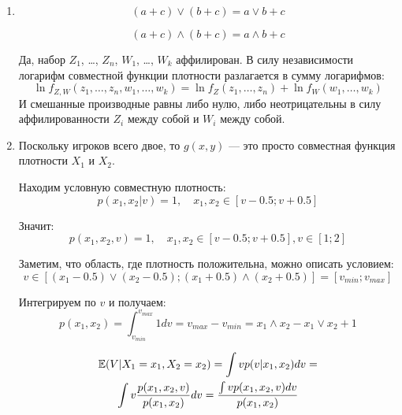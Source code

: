 \begin{enumerate}


\item
\begin{equation}
(a+c)\vee (b+c)=a\vee b +c
\end{equation}

\begin{equation}
(a+c)\wedge (b+c)=a\wedge b +c
\end{equation}

Да, набор $ Z_{1} $, \ldots , $ Z_{n} $, $ W_{1} $, \ldots , $ W_{k} $ аффилирован. В силу независимости логарифм совместной функции плотности разлагается в сумму логарифмов:
\begin{equation}
\ln f_{Z,W}(z_{1},\ldots ,z_{n},w_{1},\ldots ,w_{k})= \ln f_{Z}(z_{1},\ldots ,z_{n})+\ln f_{W}(w_{1},\ldots ,w_{k})
\end{equation}
И смешанные производные равны либо нулю, либо неотрицательны в силу аффилированности $ Z_{i} $ между собой и $ W_{i} $ между собой.

\item  Поскольку игроков всего двое, то $ g(x,y)$ — это просто совместная функция плотности $ X_{1} $ и $ X_{2} $.

Находим условную совместную плотность:
\begin{equation}
p(x_{1},x_{2}|v)=1, \quad x_{1},x_{2}\in [v-0.5;v+0.5]
\end{equation}

Значит:
\begin{equation}
p(x_{1},x_{2},v)=1, \quad x_{1},x_{2}\in [v-0.5;v+0.5],v\in [1;2]
\end{equation}

Заметим, что область, где плотность положительна, можно описать условием:
\begin{equation}
v\in [(x_{1}-0.5)\vee (x_{2}-0.5); (x_{1}+0.5)\wedge (x_{2}+0.5)]=[v_{min};v_{max}]
\end{equation}

Интегрируем по $ v $ и получаем:
\begin{equation}
p(x_{1},x_{2})=\int_{v_{min}}^{v_{max}} 1 dv= v_{max}-v_{min}=x_{1}\wedge x_{2}-x_{1}\vee x_{2}+1
\end{equation}

\begin{multline}
\mathbb{E}(V|X_{1}=x_{1}, X_{2}=x_{2})=\int v p(v|x_{1},x_{2})dv=\\
\int v \frac{p(x_{1},x_{2},v)}{p(x_{1},x_{2})} dv=\frac{\int v p(x_{1},x_{2},v) dv }{p(x_{1},x_{2})}
\end{multline}


\end{enumerate}
